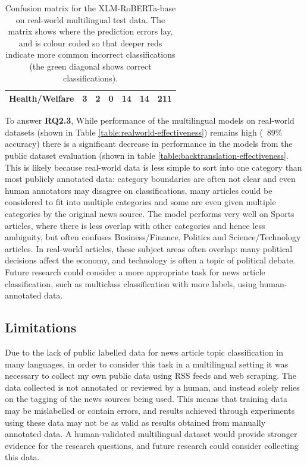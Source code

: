 \documentclass{l4proj}
\begin{document}
\begin{table}[h]
\begin{tabular}{lllllll}
\textbf{Health/Welfare}                   & \cellcolor[HTML]{FFCCC9}3            & \cellcolor[HTML]{FFCCC9}2            & 0                                    & \cellcolor[HTML]{FD6864}14           & \cellcolor[HTML]{FD6864}14           & \cellcolor[HTML]{67FD9A}\textbf{211} \\ \hline
\end{tabular}
\caption{Confusion matrix for the XLM-RoBERTa-base on real-world multilingual test data. The matrix shows where the prediction errors lay, and is colour coded so that deeper reds indicate more common incorrect classifications (the green diagonal shows correct classifications).}
\label{table:confusion_matrix}
\end{table}

To answer \textbf{RQ2.3}, While performance of the multilingual models on real-world datasets (shown in Table \ref{table:realworld-effectiveness}) remains high (~89\% accuracy) there is a significant decrease in performance in the models from the public dataset evaluation (shown in table \ref{table:backtranslation-effectiveness}. This is likely because real-world data is less simple to sort into one category than most publicly annotated data: category boundaries are often not clear and even human annotators may disagree on classifications, many articles could be considered to fit into multiple categories and some are even given multiple categories by the original news source. The model performs very well on Sports articles, where there is less overlap with other categories and hence less ambiguity, but often confuses Business/Finance, Politics and Science/Technology articles. In real-world articles, these subject areas often overlap: many political decisions affect the economy, and technology is often a topic of political debate. Future research could consider a more appropriate task for news article classification, such as multiclass classification with more labels, using human-annotated data.

\subsection{Limitations}
\label{section:classification-limitations}
Due to the lack of public labelled data for news article topic classification in many languages, in order to consider this task in a multilingual setting it was necessary to collect my own public data using RSS feeds and web scraping. The data collected is not annotated or reviewed by a human, and instead solely relies on the tagging of the news sources being used. This means that training data may be mislabelled or contain errors, and results achieved through experiments using these data may not be as valid as results obtained from manually annotated data. A human-validated multilingual dataset would provide stronger evidence for the research questions, and future research could consider collecting this data.\par
\end{document}

